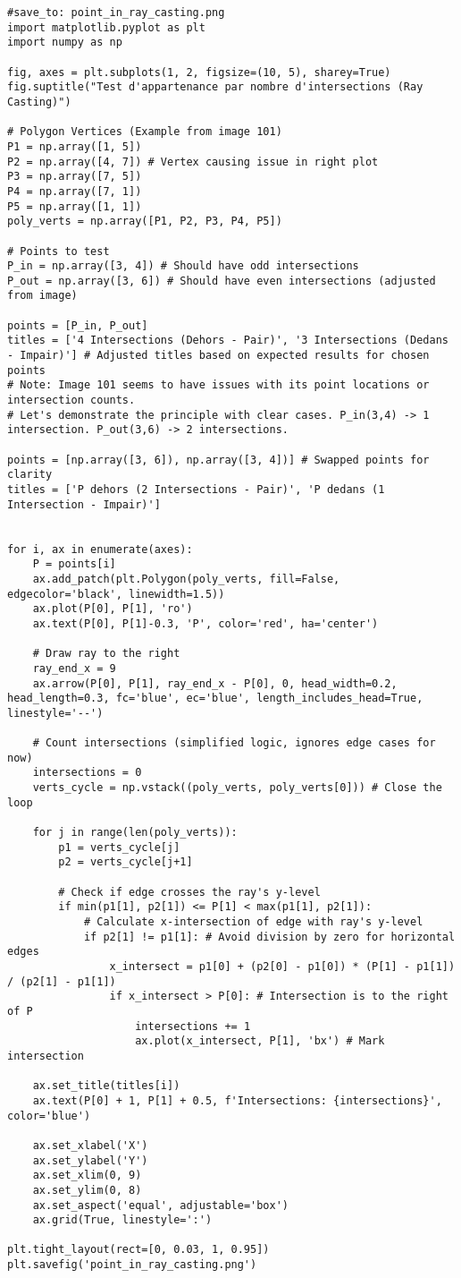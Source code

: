 \documentclass{article}
\begin{document}
\begin{verbatim}
#save_to: point_in_ray_casting.png
import matplotlib.pyplot as plt
import numpy as np

fig, axes = plt.subplots(1, 2, figsize=(10, 5), sharey=True)
fig.suptitle("Test d'appartenance par nombre d'intersections (Ray Casting)")

# Polygon Vertices (Example from image 101)
P1 = np.array([1, 5])
P2 = np.array([4, 7]) # Vertex causing issue in right plot
P3 = np.array([7, 5])
P4 = np.array([7, 1])
P5 = np.array([1, 1])
poly_verts = np.array([P1, P2, P3, P4, P5])

# Points to test
P_in = np.array([3, 4]) # Should have odd intersections
P_out = np.array([3, 6]) # Should have even intersections (adjusted from image)

points = [P_in, P_out]
titles = ['4 Intersections (Dehors - Pair)', '3 Intersections (Dedans - Impair)'] # Adjusted titles based on expected results for chosen points
# Note: Image 101 seems to have issues with its point locations or intersection counts.
# Let's demonstrate the principle with clear cases. P_in(3,4) -> 1 intersection. P_out(3,6) -> 2 intersections.

points = [np.array([3, 6]), np.array([3, 4])] # Swapped points for clarity
titles = ['P dehors (2 Intersections - Pair)', 'P dedans (1 Intersection - Impair)']


for i, ax in enumerate(axes):
    P = points[i]
    ax.add_patch(plt.Polygon(poly_verts, fill=False, edgecolor='black', linewidth=1.5))
    ax.plot(P[0], P[1], 'ro')
    ax.text(P[0], P[1]-0.3, 'P', color='red', ha='center')

    # Draw ray to the right
    ray_end_x = 9
    ax.arrow(P[0], P[1], ray_end_x - P[0], 0, head_width=0.2, head_length=0.3, fc='blue', ec='blue', length_includes_head=True, linestyle='--')

    # Count intersections (simplified logic, ignores edge cases for now)
    intersections = 0
    verts_cycle = np.vstack((poly_verts, poly_verts[0])) # Close the loop

    for j in range(len(poly_verts)):
        p1 = verts_cycle[j]
        p2 = verts_cycle[j+1]

        # Check if edge crosses the ray's y-level
        if min(p1[1], p2[1]) <= P[1] < max(p1[1], p2[1]):
            # Calculate x-intersection of edge with ray's y-level
            if p2[1] != p1[1]: # Avoid division by zero for horizontal edges
                x_intersect = p1[0] + (p2[0] - p1[0]) * (P[1] - p1[1]) / (p2[1] - p1[1])
                if x_intersect > P[0]: # Intersection is to the right of P
                    intersections += 1
                    ax.plot(x_intersect, P[1], 'bx') # Mark intersection

    ax.set_title(titles[i])
    ax.text(P[0] + 1, P[1] + 0.5, f'Intersections: {intersections}', color='blue')

    ax.set_xlabel('X')
    ax.set_ylabel('Y')
    ax.set_xlim(0, 9)
    ax.set_ylim(0, 8)
    ax.set_aspect('equal', adjustable='box')
    ax.grid(True, linestyle=':')

plt.tight_layout(rect=[0, 0.03, 1, 0.95])
plt.savefig('point_in_ray_casting.png')
\end{verbatim}
\end{document}
